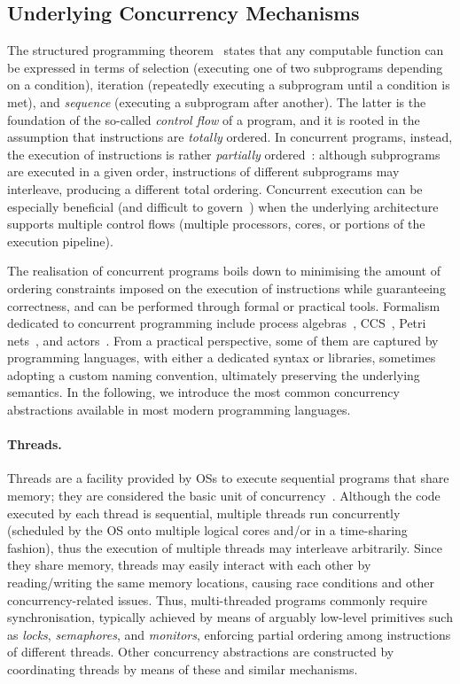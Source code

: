 \subsection{Underlying Concurrency Mechanisms}
\label{sec:concurrency_abstractions}

The structured programming theorem~\cite{BohmJacopini1966} states that any computable function can be expressed in terms of
selection (executing one of two subprograms depending on a condition),
iteration (repeatedly executing a subprogram until a condition is met),
and
\emph{sequence} (executing a subprogram after another).
%
The latter is the foundation of the so-called \emph{control flow} of a program,
and it is rooted in the assumption that instructions are \emph{totally} ordered.
%
In concurrent programs, instead,
the execution of instructions is rather \emph{partially} ordered~\cite{Lamport1978}:
although subprograms are executed in a given order,
instructions of different subprograms may interleave,
producing a different total ordering.
%
Concurrent execution can be especially beneficial
(and difficult to govern~\cite{Batty2017})
when the underlying architecture supports multiple control flows
(multiple processors, cores, or portions of the execution pipeline).

The realisation of concurrent programs
boils down to
minimising the amount of ordering constraints imposed on the execution of instructions
while guaranteeing correctness,
and
can be performed through formal or practical tools. %
%
Formalism dedicated to concurrent programming include process algebras~\cite{Hoare78}, \ac{CCS}~\cite{Milner80}, Petri nets~\cite{Petri1966}, and actors~\cite{Agha1986}.
%
From a practical perspective,
some of them are captured by programming languages,
with either a dedicated syntax or libraries,
sometimes adopting a custom naming convention,
ultimately preserving the underlying semantics.
%
In the following,
we introduce the most common concurrency abstractions available in most modern programming languages.

\paragraph{Threads.}

Threads are a facility provided by \acp{OS} to execute sequential programs that share memory;
they are considered the basic unit of concurrency~\cite{Dijkstra1965}.
%
Although the code executed by each thread is sequential,
multiple threads run concurrently
(scheduled by the \ac{OS} onto multiple logical cores and/or in a time-sharing fashion),
thus the execution of multiple threads may interleave arbitrarily.
%
Since they share memory,
threads may easily interact with each other by reading/writing the same memory locations,
causing race conditions and other concurrency-related issues.
%
Thus, multi-threaded programs commonly require synchronisation,
typically achieved by means of arguably low-level primitives
such as \emph{locks}, \emph{semaphores}, and \emph{monitors},
enforcing partial ordering among instructions of different threads.
%
Other concurrency abstractions are constructed by coordinating threads by means of these and similar mechanisms.


